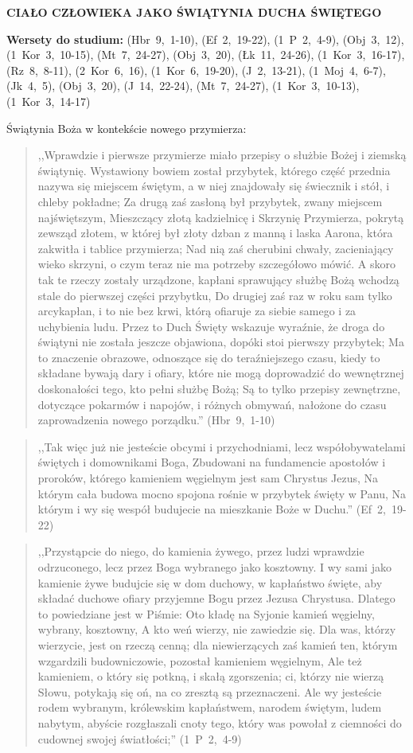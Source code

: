 \documentclass[10pt,a4paper,oneside]{article}
\begin{document}
\centerline{\textbf{\MakeUppercase{Ciało człowieka jako Świątynia Ducha Świętego}}}
\begin{center}
\textbf{Wersety do studium:} (Hbr~9,~1-10), (Ef~2,~19-22), (1~P~2,~4-9), (Obj~3,~12), (1~Kor~3,~10-15), (Mt~7,~24-27), (Obj~3,~20), (Łk~11,~24-26), (1~Kor~3,~16-17), (Rz~8,~8-11), (2~Kor~6,~16), (1~Kor~6,~19-20), (J~2,~13-21), (1~Moj~4,~6-7), (Jk~4,~5), (Obj~3,~20), (J~14,~22-24), (Mt~7,~24-27), (1~Kor~3,~10-13), (1~Kor~3,~14-17)
\end{center}
Świątynia Boża w kontekście nowego przymierza:
\begin{quote}
,,Wprawdzie i pierwsze przymierze miało przepisy o służbie Bożej i ziemską świątynię. Wystawiony bowiem został przybytek, którego część przednia nazywa się miejscem świętym, a w niej znajdowały się świecznik i stół, i chleby pokładne; Za drugą zaś zasłoną był przybytek, zwany miejscem najświętszym, Mieszczący złotą kadzielnicę i Skrzynię Przymierza, pokrytą zewsząd złotem, w której był złoty dzban z manną i laska Aarona, która zakwitła i tablice przymierza; Nad nią zaś cherubini chwały, zacieniający wieko skrzyni, o czym teraz nie ma potrzeby szczegółowo mówić. A skoro tak te rzeczy zostały urządzone, kapłani sprawujący służbę Bożą wchodzą stale do pierwszej części przybytku, Do drugiej zaś raz w roku sam tylko arcykapłan, i to nie bez krwi, którą ofiaruje za siebie samego i za uchybienia ludu. Przez to Duch Święty wskazuje wyraźnie, że droga do świątyni nie została jeszcze objawiona, dopóki stoi pierwszy przybytek; Ma to znaczenie obrazowe, odnoszące się do teraźniejszego czasu, kiedy to składane bywają dary i ofiary, które nie mogą doprowadzić do wewnętrznej doskonałości tego, kto pełni służbę Bożą; Są to tylko przepisy zewnętrzne, dotyczące pokarmów i napojów, i różnych obmywań, nałożone do czasu zaprowadzenia nowego porządku.'' (Hbr~9,~1-10)
\end{quote}
\begin{quote}
,,Tak więc już nie jesteście obcymi i przychodniami, lecz współobywatelami świętych i domownikami Boga, Zbudowani na fundamencie apostołów i proroków, którego kamieniem węgielnym jest sam Chrystus Jezus, Na którym cała budowa mocno spojona rośnie w przybytek święty w Panu, Na którym i wy się wespół budujecie na mieszkanie Boże w Duchu.'' (Ef~2,~19-22)
\end{quote}
\begin{quote}
,,Przystąpcie do niego, do kamienia żywego, przez ludzi wprawdzie odrzuconego, lecz przez Boga wybranego jako kosztowny. I wy sami jako kamienie żywe budujcie się w dom duchowy, w kapłaństwo święte, aby składać duchowe ofiary przyjemne Bogu przez Jezusa Chrystusa. Dlatego to powiedziane jest w Piśmie: Oto kładę na Syjonie kamień węgielny, wybrany, kosztowny, A kto weń wierzy, nie zawiedzie się. Dla was, którzy wierzycie, jest on rzeczą cenną; dla niewierzących zaś kamień ten, którym wzgardzili budowniczowie, pozostał kamieniem węgielnym, Ale też kamieniem, o który się potkną, i skałą zgorszenia; ci, którzy nie wierzą Słowu, potykają się oń, na co zresztą są przeznaczeni. Ale wy jesteście rodem wybranym, królewskim kapłaństwem, narodem świętym, ludem nabytym, abyście rozgłaszali cnoty tego, który was powołał z ciemności do cudownej swojej światłości;'' (1~P~2,~4-9)
\end{quote}
\end{document}
